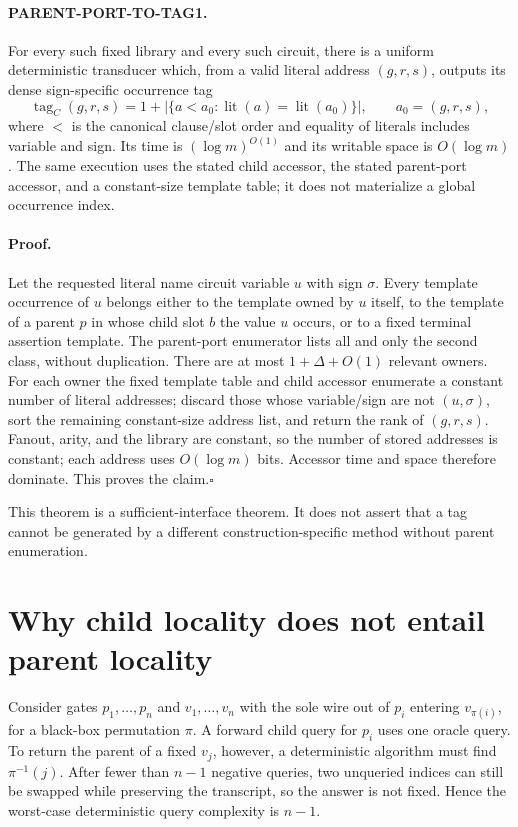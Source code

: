 \documentclass[11pt]{article}
\begin{document}
\paragraph{PARENT-PORT-TO-TAG1.}
For every such fixed library and every such circuit, there is a uniform
deterministic transducer which, from a valid literal address $(g,r,s)$,
outputs its dense sign-specific occurrence tag
\[
  \operatorname{tag}_C(g,r,s)
  =1+\bigl|\{a<a_0:\operatorname{lit}(a)
                     =\operatorname{lit}(a_0)\}\bigr|,
  \qquad a_0=(g,r,s),
\]
where $<$ is the canonical clause/slot order and equality of literals
includes variable and sign.  Its time is $(\log m)^{O(1)}$ and its writable
space is $O(\log m)$.  The same execution uses the stated child accessor,
the stated parent-port accessor, and a constant-size template table; it does
not materialize a global occurrence index.

\paragraph{Proof.}
Let the requested literal name circuit variable $u$ with sign $\sigma$.
Every template occurrence of $u$ belongs either to the template owned by $u$
itself, to the template of a parent $p$ in whose child slot $b$ the value
$u$ occurs, or to a fixed terminal assertion template.  The parent-port
enumerator lists all and only the second class, without duplication.  There
are at most $1+\Delta+O(1)$ relevant owners.  For each owner the fixed
template table and child accessor enumerate a constant number of literal
addresses; discard those whose variable/sign are not $(u,\sigma)$, sort the
remaining constant-size address list, and return the rank of $(g,r,s)$.
Fanout, arity, and the library are constant, so the number of stored
addresses is constant; each address uses $O(\log m)$ bits.  Accessor time and
space therefore dominate.  This proves the claim.\hfill$\square$

This theorem is a sufficient-interface theorem.  It does not assert that a
tag cannot be generated by a different construction-specific method without
parent enumeration.

\section{Why child locality does not entail parent locality}

Consider gates $p_1,\ldots,p_n$ and $v_1,\ldots,v_n$ with the sole wire out
of $p_i$ entering $v_{\pi(i)}$, for a black-box permutation $\pi$.  A forward
child query for $p_i$ uses one oracle query.  To return the parent of a fixed
$v_j$, however, a deterministic algorithm must find $\pi^{-1}(j)$.  After
fewer than $n-1$ negative queries, two unqueried indices can still be swapped
while preserving the transcript, so the answer is not fixed.  Hence the
worst-case deterministic query complexity is $n-1$.
\end{document}
